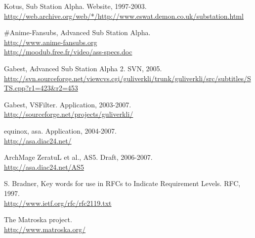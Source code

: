 \documentclass{spec}
\begin{document}
\begin{thebibliography}{1}
 Kotus, Sub Station Alpha. Website, 1997-2003.\\
\url{http://web.archive.org/web/*/http://www.eswat.demon.co.uk/substation.html}

 \#Anime-Fansubs, Advanced Sub Station Alpha.\\
\url{http://www.anime-fansubs.org}\\
\url{http://moodub.free.fr/video/ass-specs.doc}

 Gabest, Advanced Sub Station Alpha 2. SVN, 2005.\\
\url{http://svn.sourceforge.net/viewcvs.cgi/guliverkli/trunk/guliverkli/src/subtitles/STS.cpp?r1=423&r2=453}

 Gabest, VSFilter. Application, 2003-2007.\\
\url{http://sourceforge.net/projects/guliverkli/}

 equinox, asa. Application, 2004-2007.\\
\url{http://asa.diac24.net/}

 ArchMage ZeratuL et al., AS5. Draft, 2006-2007.\\
\url{http://asa.diac24.net/AS5}

 S. Bradner, Key words for use in RFCs to Indicate Requirement Levels. RFC, 1997.\\
\url{http://www.ietf.org/rfc/rfc2119.txt}

 The Matroska project.\\
\url{http://www.matroska.org/}

\end{thebibliography}
\end{document}
